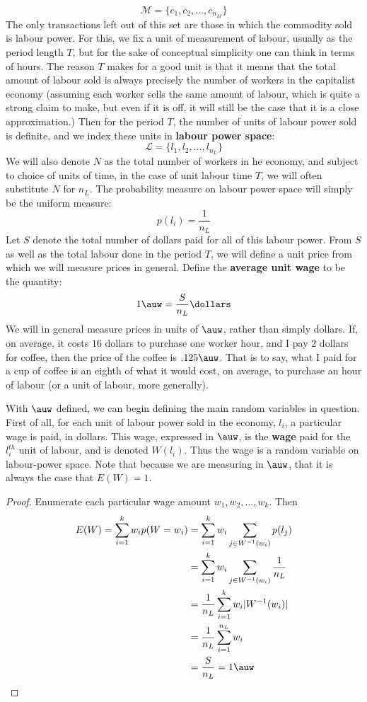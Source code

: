 \documentclass{article}
\theoremstyle{definition}
\theoremstyle{plain}
\theoremstyle{theorem}
\begin{document}
\[ \mathcal{M} = \{c_1,c_2,...,c_{n_M}\} \]
The only transactions left out of this set are those in which the commodity sold is labour power. For this, we fix a unit of measurement of labour, usually as the period length $T$, but for the sake of conceptual simplicity one can think in terms of hours. The reason $T$ makes for a good unit is that it means that the total amount of labour sold is always precisely the number of workers in the capitalist economy (assuming each worker sells the same amount of labour, which is quite a strong claim to make, but even if it is off, it will still be the case that it is a close approximation.) Then for the period $T$, the number of units of labour power sold is definite, and we index these units in \textbf{labour power space}:
\[ \mathcal{L} = \{l_1,l_2,...,l_{n_L}\} \]
We will also denote $N$ as the total number of workers in he economy, and subject to choice of units of time, in the case of unit labour time $T$, we will often substitute $N$ for $n_L$. The probability measure on labour power space will simply be the uniform measure:
\[ p(l_i) = \frac{1}{n_L} \]
Let $S$ denote the total number of dollars paid for all of this labour power. From $S$ as well as the total labour done in the period $T$, we will define a unit price from which we will measure prices in general. Define the \textbf{average unit wage} to be the quantity:
\[ 1 \auw = \frac{S}{n_L} \dollars \]
We will in general measure prices in units of $\auw$, rather than simply dollars. If, on average, it costs $16$ dollars to purchase one worker hour, and I pay $2$ dollars for coffee, then the price of the coffee is $.125\auw$. That is to say, what I paid for a cup of coffee is an eighth of what it would cost, on average, to purchase an hour of labour (or a unit of labour, more generally). \par 
With $\auw$ defined, we can begin defining the main random variables in question. First of all, for each unit of labour power sold in the economy, $l_i$, a particular wage is paid, in dollars. This wage, expressed in $\auw$, is the \textbf{wage} paid for the $l_i^{th}$ unit of labour, and is denoted $W(l_i)$. Thus the wage is a random variable on labour-power space. Note that because we are measuring in $\auw$, that it is always the case that $E(W) = 1$.
\begin{proof}
	Enumerate each particular wage amount $w_1,w_2,...,w_k$. Then
	\begin{align}
		E(W) = \sum_{i=1}^k w_i p(W = w_i) &= \sum_{i=1}^k w_i \sum_{j \in W^{-1}(w_i)}p(l_j) \\
			&= \sum_{i=1}^k w_i \sum_{j \in W^{-1}(w_i)}\frac{1}{n_L} \\
			&= \frac{1}{n_L}\sum_{i=1}^k w_i |W^{-1}(w_i)| \\
			&= \frac{1}{n_L}\sum_{i=1}^{n_L}w_i \\
			&= \frac{S}{n_L} = 1 \auw
	\end{align}  
\end{proof}
\end{document}
